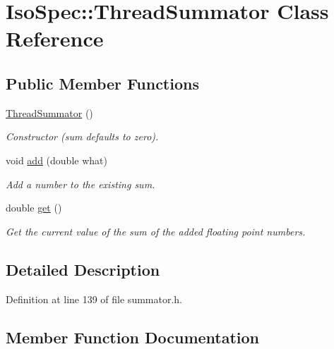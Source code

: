 \hypertarget{class_iso_spec_1_1_thread_summator}{}\section{Iso\+Spec\+:\+:Thread\+Summator Class Reference}
\label{class_iso_spec_1_1_thread_summator}
\subsection*{Public Member Functions}
\begin{DoxyCompactItemize}
\item 
\mbox{\label{class_iso_spec_1_1_thread_summator_a81c6246b37dd7f07071d4d561132beae}} 
\mbox{\hyperlink{class_iso_spec_1_1_thread_summator_a81c6246b37dd7f07071d4d561132beae}{Thread\+Summator}} ()
\begin{DoxyCompactList}\small\item\em Constructor (sum defaults to zero). \end{DoxyCompactList}\item 
void \mbox{\hyperlink{class_iso_spec_1_1_thread_summator_a744c019ec413dcc8cf8a93d9f3009f21}{add}} (double what)
\begin{DoxyCompactList}\small\item\em Add a number to the existing sum. \end{DoxyCompactList}\item 
\mbox{\label{class_iso_spec_1_1_thread_summator_a55e0601a6f9722b0c2ca7e0394dc00b8}} 
double \mbox{\hyperlink{class_iso_spec_1_1_thread_summator_a55e0601a6f9722b0c2ca7e0394dc00b8}{get}} ()
\begin{DoxyCompactList}\small\item\em Get the current value of the sum of the added floating point numbers. \end{DoxyCompactList}\end{DoxyCompactItemize}


\subsection{Detailed Description}


Definition at line 139 of file summator.\+h.



\subsection{Member Function Documentation}
\mbox{\label{class_iso_spec_1_1_thread_summator_a744c019ec413dcc8cf8a93d9f3009f21}} 
